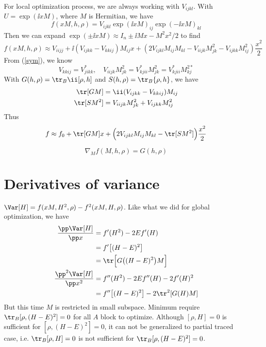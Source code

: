 \documentclass{article}
\begin{document}
For local optimization process, we are always working with $V_{ijkl}$. With $U=\exp(\ii xM)$, where $M$ is Hermitian, we have
\[f(xM, h, \rho)=V_{ijkl}\exp(\ii xM)_{ij}\exp(-\ii xM)_{kl}\]
Then we can expand $\exp(\pm\ii xM)\approx I_n\pm\ii Mx-M^2x^2/2$ to find
\[f(xM, h, \rho) \approx V_{iijj} + \ii(V_{ijkk}-V_{kkij})M_{ij}x + (2V_{ijkl}M_{ij}M_{kl}-V_{iijk}M^2_{jk}-V_{ijkk}M^2_{ij})\frac{x^2}{2}
\]
From (\ref{sym}), we know \[V_{kkij}=V_{jikk}^*,\quad V_{iijk}M_{jk}^2=V_{kjii}^*M_{jk}^2=V_{kjii}^*M_{kj}^{2*} \]
With $G(h,\rho)=\tr_B\ii[\rho, h]$ and $S(h,\rho)=\tr_B\{\rho, h\}$, we have
\begin{align}
	\tr[GM] &= \ii(V_{ijkk}-V_{kkij})M_{ij}\\ \tr[SM^2]&=V_{iijk}M^2_{jk}+V_{ijkk}M^2_{ij}
\end{align}
Thus
\begin{equation}
	f\approx f_0+\tr[GM]x+\Big(2V_{ijkl}M_{ij}M_{kl}-\tr[SM^2]\Big)\frac{x^2}{2}
\end{equation}

\begin{equation}
\nabla_{M} f(M, h, \rho)= G(h, \rho)
\end{equation}
\section{Derivatives of variance}
$\Var[H]=f(xM, H^2, \rho)-f^2(xM, H, \rho)$. Like what we did for global optimization, we have
\begin{align}
	\frac{\pp \Var[H]}{\pp x} &= f'(H^2)-2Ef'(H)\\
	    &=f'\big[(H-E)^2\big]\\
		&=\tr\Big[G\big((H-E)^2\big)M\Big]\\
	\frac{\pp^2 \Var[H]}{\pp x^2}&=f''(H^2)-2Ef''(H)-2f'(H)^2\\
	&=f''\big[(H-E)^2\big]-2\tr^2[G(H)M]
\end{align}
But this time $M$ is restricted in small subspace. Minimum require
$\tr_B[\rho, (H-E)^2]=0$ for all $A$ block to optimize. Although $[\rho, H]=0$ is sufficient for $[\rho, (H-E)^2]=0$, it can not be generalized to partial traced case, i.e. $\tr_B[\rho, H]=0$ is not sufficient for $\tr_B[\rho, (H-E)^2]=0$.
\end{document}
